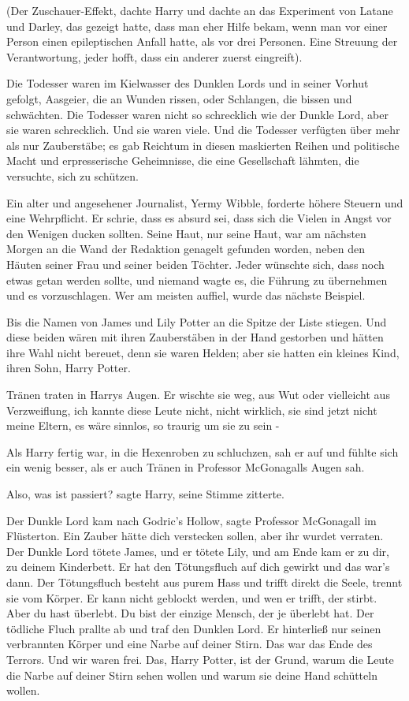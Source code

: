 (Der Zuschauer-Effekt, dachte Harry und dachte an das Experiment von Latane und
Darley, das gezeigt hatte, dass man eher Hilfe bekam, wenn man vor einer Person
einen epileptischen Anfall hatte, als vor drei Personen. Eine Streuung der
Verantwortung, jeder hofft, dass ein anderer zuerst eingreift).

Die Todesser waren im Kielwasser des Dunklen Lords und in seiner Vorhut gefolgt,
Aasgeier, die an Wunden rissen, oder Schlangen, die bissen und schwächten. Die
Todesser waren nicht so schrecklich wie der Dunkle Lord, aber sie waren
schrecklich. Und sie waren viele. Und die Todesser verfügten über mehr als nur
Zauberstäbe; es gab Reichtum in diesen maskierten Reihen und politische Macht
und erpresserische Geheimnisse, die eine Gesellschaft lähmten, die versuchte,
sich zu schützen.

Ein alter und angesehener Journalist, Yermy Wibble, forderte höhere Steuern und
eine Wehrpflicht. Er schrie, dass es absurd sei, dass sich die Vielen in Angst
vor den Wenigen ducken sollten. Seine Haut, nur seine Haut, war am nächsten
Morgen an die Wand der Redaktion genagelt gefunden worden, neben den Häuten
seiner Frau und seiner beiden Töchter. Jeder wünschte sich, dass noch etwas
getan werden sollte, und niemand wagte es, die Führung zu übernehmen und es
vorzuschlagen. Wer am meisten auffiel, wurde das nächste Beispiel.

Bis die Namen von James und Lily Potter an die Spitze der Liste stiegen. Und
diese beiden wären mit ihren Zauberstäben in der Hand gestorben und hätten ihre
Wahl nicht bereuet, denn sie waren Helden; aber sie hatten ein kleines Kind,
ihren Sohn, Harry Potter.

Tränen traten in Harrys Augen. Er wischte sie weg, aus Wut oder vielleicht aus
Verzweiflung, ich kannte diese Leute nicht, nicht wirklich, sie sind jetzt nicht
meine Eltern, es wäre sinnlos, so traurig um sie zu sein -

Als Harry fertig war, in die Hexenroben zu schluchzen, sah er auf und fühlte
sich ein wenig besser, als er auch Tränen in Professor McGonagalls Augen sah.

\glqq Also, was ist passiert?\grqq{} sagte Harry, seine Stimme zitterte.

\glqq Der Dunkle Lord kam nach Godric's Hollow\grqq{}, sagte Professor
McGonagall im Flüsterton. \glqq Ein Zauber hätte dich verstecken sollen, aber
ihr wurdet verraten. Der Dunkle Lord tötete James, und er tötete Lily, und am
Ende kam er zu dir, zu deinem Kinderbett. Er hat den Tötungsfluch auf dich
gewirkt und das war's dann. Der Tötungsfluch besteht aus purem Hass und trifft
direkt die Seele, trennt sie vom Körper. Er kann nicht geblockt werden, und wen
er trifft, der stirbt. Aber du hast überlebt. Du bist der einzige Mensch, der je
überlebt hat. Der tödliche Fluch prallte ab und traf den Dunklen Lord. Er
hinterließ nur seinen verbrannten Körper und eine Narbe auf deiner Stirn. Das
war das Ende des Terrors. Und wir waren frei. Das, Harry Potter, ist der Grund,
warum die Leute die Narbe auf deiner Stirn sehen wollen und warum sie deine Hand
schütteln wollen.\grqq{}

